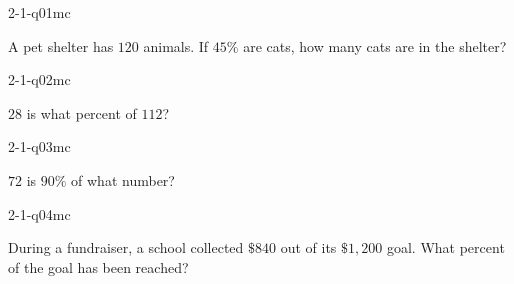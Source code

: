 

\begin{practiceQuestion}{2-1-q01}{mc}
\begin{questionText}
A pet shelter has $120$ animals. If $45\%$ are cats, how many cats are in the shelter?
\end{questionText}
\end{practiceQuestion}

\begin{practiceQuestion}{2-1-q02}{mc}
\begin{questionText}
$28$ is what percent of $112$?
\end{questionText}
\end{practiceQuestion}

\begin{practiceQuestion}{2-1-q03}{mc}
\begin{questionText}
$72$ is $90\%$ of what number?
\end{questionText}
\end{practiceQuestion}

\begin{practiceQuestion}{2-1-q04}{mc}
\begin{questionText}
During a fundraiser, a school collected $\$840$ out of its $\$1{,}200$ goal. What percent of the goal has been reached?
\end{questionText}
\end{practiceQuestion}

